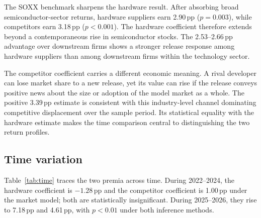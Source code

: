 \documentclass[review,12pt,authoryear]{elsarticle}
\newcommand{\pp}{\,pp}
\begin{document}
The SOXX benchmark sharpens the hardware result. After absorbing broad
semiconductor-sector returns, hardware suppliers earn 2.90\pp{}
($p=0.003$), while competitors earn 3.18\pp{} ($p<0.001$). The hardware
coefficient therefore extends beyond a contemporaneous rise in semiconductor
stocks. The 2.53--2.66\pp{} advantage over downstream firms shows a stronger
release response among hardware suppliers than among downstream firms within
the technology sector.

The competitor coefficient carries a different economic meaning. A rival
developer can lose market share to a new release, yet its value can rise
if the release conveys positive news about the size or adoption of the model
market as a whole. The positive 3.39\pp{} estimate is consistent with this
industry-level channel dominating competitive displacement over the sample
period. Its statistical equality with the hardware estimate makes the time
comparison central to distinguishing the two return profiles.

\subsection{Time variation}

Table~\ref{tab:time} traces the two premia across time. During 2022--2024,
the hardware coefficient is $-1.28$\pp{} and the competitor coefficient is
1.00\pp{} under the market model; both are statistically insignificant.
During 2025--2026, they rise to 7.18\pp{} and 4.61\pp{}, with $p<0.01$
under both inference methods.
\end{document}
